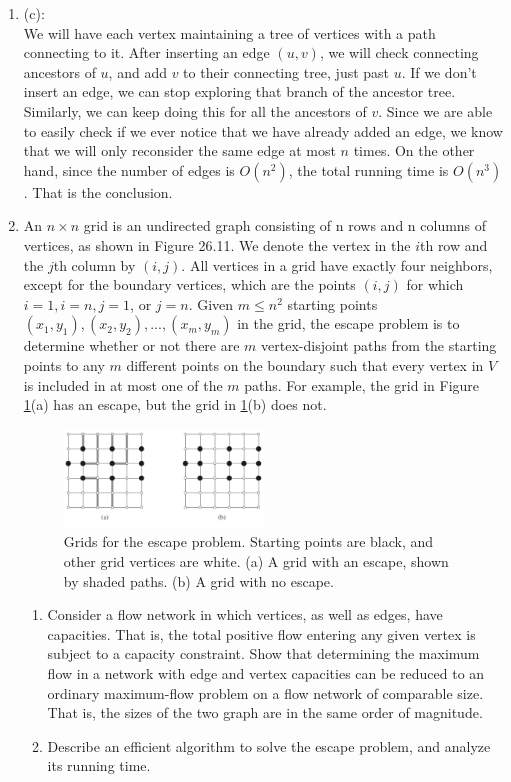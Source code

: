 \documentclass[12pt,a4paper]{article}
\makeatletter
\newtheorem*{solution}{Solution}
\theoremstyle{definition}
\renewenvironment{solution}[1][Solution] {\par\pushQED{\qed}\normalfont\topsep6\p@\@plus6\p@\relax\trivlist\item[\hskip\labelsep\bfseries#1\@addpunct{.}]\ignorespaces}{\popQED\endtrivlist\@endpefalse} \makeatother
\makeatother
\begin{document}
\begin{enumerate}
\begin{solution}
    (c):\\
    We will have each vertex maintaining a tree of vertices with a path connecting to it. After inserting an edge $\left(u, v\right)$, we will check connecting ancestors of $u$, and add $v$ to their connecting tree, just past $u$. If we  don't insert an edge, we can stop exploring that branch of the ancestor tree. Similarly, we can keep doing this for all the ancestors of $v$. Since we are able to easily check if we ever notice that we have already added an edge, we know that we will only reconsider the same edge at most $n$ times. On the other hand,  since the number of edges is $O\left(n^2\right)$, the total running time is $O\left(n^3\right)$. That is the conclusion.
	
	\end{solution}
	
	
	
	\item An $n\times n$ grid is an undirected graph consisting of n rows and n columns of vertices, as shown in Figure 26.11. We denote the vertex in the $i$th row and the $j$th column by $(i,j)$. All vertices in a grid have exactly four neighbors, except for the boundary vertices, which are the points $(i,j)$ for which $i = 1, i = n, j = 1$, or $j = n$.
    Given $m\leqslant n^2$ starting points $(x_1,y_1), (x_2, y_2), ... , (x_m, y_m)$ in the grid, the escape problem is to determine whether or not there are $m$ vertex-disjoint paths from the starting points to any $m$ different points on the boundary such that every vertex in $V$ is included in at most one of the $m$ paths. For example, the grid in Figure \ref{Fig-EscapeProblem}(a) has an escape, but the grid in \ref{Fig-EscapeProblem}(b) does not.
    \begin{figure}[!htbp]
	\centering
	\includegraphics[width=0.5\textwidth]{Fig-EscapeProblem.pdf}
	\caption{Grids for the escape problem. Starting points are black, and other grid vertices are white. (a) A grid with an escape, shown by shaded paths. (b) A grid with no escape.}
	\label{Fig-EscapeProblem}
	\end{figure}
    \begin{enumerate}
        \item Consider a flow network in which vertices, as well as edges, have capacities. That is, the total positive flow entering any given vertex is subject to a capacity constraint. Show that determining the maximum flow in a network with edge and vertex capacities can be reduced to an ordinary maximum-flow problem on a flow network of comparable size. That is, the sizes of the two graph are in the same order of magnitude.
        \item Describe an efficient algorithm to solve the escape problem, and analyze its running time.
    \end{enumerate}
    

\end{enumerate}
\end{document}
